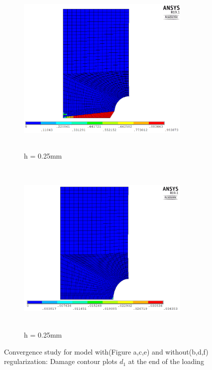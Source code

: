 \documentclass[a4paper,12pt,twoside]{report}
\begin{document}
\begin{figure}[htbp!]\ContinuedFloat
     \begin{subfigure}{0.4\textwidth}
         \includegraphics[width=8.3cm,height=8.5cm,keepaspectratio]{25.d1-0.25-r.png}
         \caption{h = 0.25mm}
         \label{fig:d1-0.25-r}
     \end{subfigure}
     \hspace{1.8cm}
     \begin{subfigure}{0.4\textwidth}
         \includegraphics[width=8.3cm,height=8.5cm,keepaspectratio]{25.d1-0.25-nr.png}
         \caption{h = 0.25mm}
         \label{fig:d1-0.25-nr}
     \end{subfigure}     
        \caption{Convergence study for model with(Figure a,c,e) and without(b,d,f) regularization: Damage contour plots $d_{1}$ at the end of the loading}
        \label{fig:Convergence study for model with and without regularization}     
\end{figure}
\end{document}
